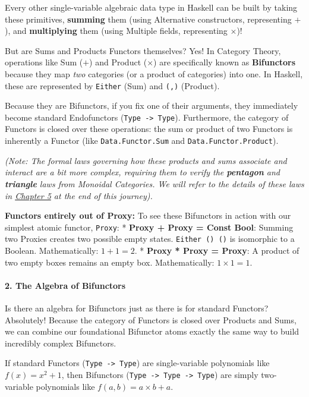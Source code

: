 \documentclass[
]{article}
\begin{document}
Every other single-variable algebraic data type in Haskell can be built
by taking these primitives, \textbf{summing} them (using Alternative
constructors, representing \(+\)), and \textbf{multiplying} them (using
Multiple fields, representing \(\times\))!

But are Sums and Products Functors themselves? Yes! In Category Theory,
operations like Sum (\(+\)) and Product (\(\times\)) are specifically
known as \textbf{Bifunctors} because they map \emph{two} categories (or
a product of categories) into one. In Haskell, these are represented by
\texttt{Either} (Sum) and \texttt{(,)} (Product).

Because they are Bifunctors, if you fix one of their arguments, they
immediately become standard Endofunctors
(\texttt{Type\ -\textgreater{}\ Type}). Furthermore, the category of
Functors is closed over these operations: the sum or product of two
Functors is inherently a Functor (like \texttt{Data.Functor.Sum} and
\texttt{Data.Functor.Product}).

\emph{(Note: The formal laws governing how these products and sums
associate and interact are a bit more complex, requiring them to verify
the \textbf{pentagon} and \textbf{triangle} laws from Monoidal
Categories. We will refer to the details of these laws in
\hyperref[chapter-5-monoidal-categories]{Chapter 5} at the end of this
journey).}

\textbf{Functors entirely out of Proxy:} To see these Bifunctors in
action with our simplest atomic functor, \texttt{Proxy}: * \textbf{Proxy
+ Proxy = Const Bool}: Summing two Proxies creates two possible empty
states. \texttt{Either\ ()\ ()} is isomorphic to a Boolean.
Mathematically: \(1 + 1 = 2\). * \textbf{Proxy * Proxy = Proxy}: A
product of two empty boxes remains an empty box. Mathematically:
\(1 \times 1 = 1\).

\paragraph{2. The Algebra of
Bifunctors}\label{the-algebra-of-bifunctors}

Is there an algebra for Bifunctors just as there is for standard
Functors? Absolutely! Because the category of Functors is closed over
Products and Sums, we can combine our foundational Bifunctor atoms
exactly the same way to build incredibly complex Bifunctors.

If standard Functors (\texttt{Type\ -\textgreater{}\ Type}) are
single-variable polynomials like \(f(x) = x^2 + 1\), then Bifunctors
(\texttt{Type\ -\textgreater{}\ Type\ -\textgreater{}\ Type}) are simply
two-variable polynomials like \(f(a, b) = a \times b + a\).
\end{document}
